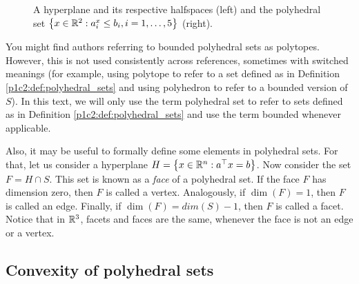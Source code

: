 \begin{figure}[h]
			\vspace{1pt}
		\caption{A hyperplane and its respective halfspaces (left) and the polyhedral set $\left\{ x\in \mathbb{R}^{2} : a_i^x \leq b_i, i =1,\dots, 5 \right \}$ (right).} \label{p1c2:fig:hyperplanes_and_polyhedral_set}		
	\end{figure}

You might find authors referring to bounded polyhedral sets as polytopes. However, this is not used consistently across references, sometimes with switched meanings (for example, using polytope to refer to a set defined as in Definition \ref{p1c2:def:polyhedral_sets} and using polyhedron to refer to a bounded version of $S$). In this text, we will only use the term polyhedral set to refer to sets defined as in Definition \ref{p1c2:def:polyhedral_sets} and use the term bounded whenever applicable.

Also, it may be useful to formally define some elements in polyhedral sets. For that, let us consider a hyperplane $H = \left\{ x \in \mathbb{R}^{n} : a^\top x = b \right \}$. Now consider the set $F = H \cap S$. This set is known as a \emph{face} of a polyhedral set. If the face $F$ has dimension zero, then $F$ is called a vertex. Analogously, if $\dim(F)=1$, then $F$ is called an edge. Finally, if $\dim(F) = dim(S)-1$, then $F$ is called a facet. Notice that in $\mathbb{R}^3$, facets and faces are the same, whenever the face is not an edge or a vertex. 


\subsection{Convexity of polyhedral sets}

